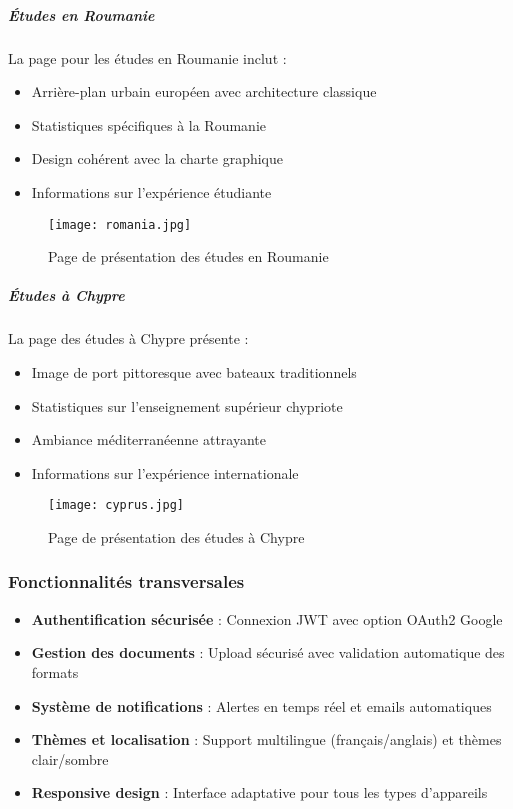 \documentclass[12pt,a4paper]{report}
\begin{document}
\subparagraph{Études en Roumanie}

La page pour les études en Roumanie inclut :

\begin{itemize}
    \item Arrière-plan urbain européen avec architecture classique
    \item Statistiques spécifiques à la Roumanie
    \item Design cohérent avec la charte graphique
    \item Informations sur l'expérience étudiante
\end{itemize}

\begin{figure}[H]
\centering
\texttt{[image: romania.jpg]}
\caption{Page de présentation des études en Roumanie}
\label{fig:romanie-page}
\end{figure}

\subparagraph{Études à Chypre}

La page des études à Chypre présente :

\begin{itemize}
    \item Image de port pittoresque avec bateaux traditionnels
    \item Statistiques sur l'enseignement supérieur chypriote
    \item Ambiance méditerranéenne attrayante
    \item Informations sur l'expérience internationale
\end{itemize}

\begin{figure}[H]
\centering
\texttt{[image: cyprus.jpg]}
\caption{Page de présentation des études à Chypre}
\label{fig:chypre-page}
\end{figure}

\subsubsection{Fonctionnalités transversales}

\begin{itemize}
    \item \textbf{Authentification sécurisée} : Connexion JWT avec option OAuth2 Google
    \item \textbf{Gestion des documents} : Upload sécurisé avec validation automatique des formats
    \item \textbf{Système de notifications} : Alertes en temps réel et emails automatiques
    \item \textbf{Thèmes et localisation} : Support multilingue (français/anglais) et thèmes clair/sombre
    \item \textbf{Responsive design} : Interface adaptative pour tous les types d'appareils
\end{itemize}
\end{document}

